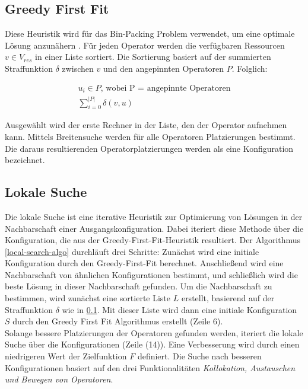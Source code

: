 \documentclass{article}
\begin{document}
\subsection{Greedy First Fit} \label{greedy-first-fit}
Diese Heuristik wird für das Bin-Packing Problem verwendet, um eine optimale Lösung anzunähern \cite{greedy-first-fit}. 
Für jeden Operator werden die verfügbaren Ressourcen $v \in V_{res}$ in einer Liste sortiert. Die Sortierung basiert auf der summierten Straffunktion $\delta$
zwischen $v$ und den angepinnten Operatoren $P$. Folglich:

\[ 
    \begin{gathered}
        u_i \in P \text{, wobei P = angepinnte Operatoren} \\
        \sum_{i=0}^{|P|} \delta(v, u)
    \end{gathered} 
\] 

Ausgewählt wird der erste Rechner in der Liste, den der Operator aufnehmen kann. Mittels Breitensuche werden für alle Operatoren Platzierungen bestimmt. 
Die daraus resultierenden Operatorplatzierungen werden als eine Konfiguration bezeichnet.




\subsection{Lokale Suche} \label{local-search}
Die lokale Suche ist eine iterative Heuristik zur Optimierung von Lösungen in der Nachbarschaft einer Ausgangskonfiguration. 
Dabei iteriert diese Methode über die Konfiguration, die aus der Greedy-First-Fit-Heuristik resultiert. 
Der Algorithmus \ref{local-search-algo} durchläuft drei Schritte: 
Zunächst wird eine initiale Konfiguration durch den Greedy-First-Fit berechnet. 
Anschließend wird eine Nachbarschaft von ähnlichen Konfigurationen bestimmt, und schließlich wird die beste Lösung in dieser Nachbarschaft gefunden.
Um die Nachbarschaft zu bestimmen, wird zunächst eine sortierte Liste $L$ erstellt, basierend auf der Straffunktion $\delta$ wie in \ref{greedy-first-fit}.
Mit dieser Liste wird dann eine initiale Konfiguration $S$ durch den Greedy First Fit Algorithmus erstellt (Zeile 6). \\


Solange bessere Platzierungen der Operatoren gefunden werden, iteriert die lokale Suche über die Konfigurationen  (Zeile (14)). 
Eine Verbesserung wird durch einen niedrigeren Wert der Zielfunktion $F$ definiert. 
Die Suche nach besseren Konfigurationen basiert auf den drei Funktionalitäten \textit{Kollokation, Austauschen und Bewegen von Operatoren}. \\
\end{document}
